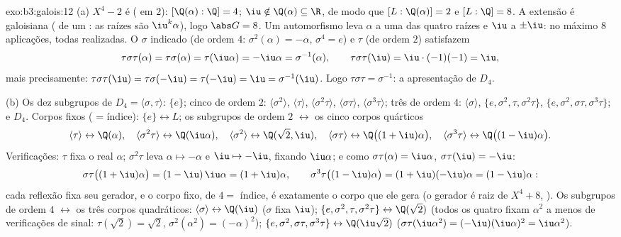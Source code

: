\begin{solution}{exo:b3:galois:12}
(a) $X^4 - 2$ é  ( em $2$):
$[\Q(\alpha):\Q] = 4$; $\iu \notin \Q(\alpha) \subseteq \R$,
de modo que $[L : \Q(\alpha)] = 2$ e $[L:\Q] = 8$. A extensão é
galoisiana ( de um : as raízes
são $\iu^k\alpha$), logo $\abs G = 8$. Um automorfismo leva
$\alpha$ a uma das quatro raízes e $\iu$ a $\pm\iu$:
no máximo $8$ aplicações, todas realizadas. O $\sigma$ indicado (de ordem
$4$: $\sigma^2(\alpha) = -\alpha$, $\sigma^4 = e$) e $\tau$
(de ordem $2$) satisfazem
\[
\tau\sigma\tau(\alpha) = \tau\sigma(\alpha) =
\tau(\iu\alpha) = -\iu\alpha = \sigma^{-1}(\alpha),
\qquad \tau\sigma\tau(\iu) = \iu\cdot(-1)(-1) = \iu ,
\]
mais precisamente: $\tau\sigma\tau(\iu) = \tau\sigma(-\iu) =
\tau(-\iu) = \iu = \sigma^{-1}(\iu)$. Logo $\tau\sigma\tau =
\sigma^{-1}$: a apresentação de $D_4$.

(b) Os dez subgrupos de $D_4 = \langle\sigma,
\tau\rangle$: $\{e\}$; cinco de ordem $2$:
$\langle\sigma^2\rangle$, $\langle\tau\rangle$,
$\langle\sigma^2\tau\rangle$, $\langle\sigma\tau\rangle$,
$\langle\sigma^3\tau\rangle$; três de ordem $4$:
$\langle\sigma\rangle$, $\{e, \sigma^2, \tau,
\sigma^2\tau\}$, $\{e, \sigma^2, \sigma\tau,
\sigma^3\tau\}$; e $D_4$. Corpos fixos ( = índice):
$\{e\} \leftrightarrow L$; os subgrupos de ordem $2$
$\leftrightarrow$ os cinco corpos quárticos
\[
\langle\tau\rangle \leftrightarrow \Q(\alpha),\quad
\langle\sigma^2\tau\rangle \leftrightarrow \Q(\iu\alpha),
\quad
\langle\sigma^2\rangle \leftrightarrow \Q(\sqrt2, \iu),\quad
\langle\sigma\tau\rangle \leftrightarrow
\Q\bigl((1+\iu)\alpha\bigr),\quad
\langle\sigma^3\tau\rangle \leftrightarrow
\Q\bigl((1-\iu)\alpha\bigr) .
\]
Verificações: $\tau$ fixa o real $\alpha$; $\sigma^2\tau$ leva
$\alpha \mapsto -\alpha$ e $\iu \mapsto -\iu$, fixando
$\iu\alpha$; e como $\sigma\tau(\alpha) = \iu\alpha$,
$\sigma\tau(\iu) = -\iu$:
\[
\sigma\tau\bigl((1+\iu)\alpha\bigr) =
(1 - \iu)\,\iu\alpha = (1 + \iu)\alpha,
\qquad
\sigma^3\tau\bigl((1-\iu)\alpha\bigr) =
(1 + \iu)(-\iu)\alpha = (1 - \iu)\alpha :
\]
cada reflexão fixa seu gerador, e o corpo fixo,
de  $4 = $ índice, é exatamente o corpo que ele gera
(o gerador é raiz de $X^4 + 8$, ). Os subgrupos de ordem $4$
$\leftrightarrow$ os três corpos quadráticos:
$\langle\sigma\rangle \leftrightarrow \Q(\iu)$ ($\sigma$
fixa $\iu$); $\{e, \sigma^2, \tau, \sigma^2\tau\}
\leftrightarrow \Q(\sqrt2)$ (todos os quatro fixam $\alpha^2$ a menos de
verificações de sinal: $\tau(\sqrt2) = \sqrt2$, $\sigma^2(\alpha^2) =
(-\alpha)^2$); $\{e, \sigma^2, \sigma\tau, \sigma^3\tau\}
\leftrightarrow \Q(\iu\sqrt2)$ ($\sigma\tau(\iu\alpha^2) =
(-\iu)(\iu\alpha)^2 = \iu\alpha^2$).


\end{solution}
